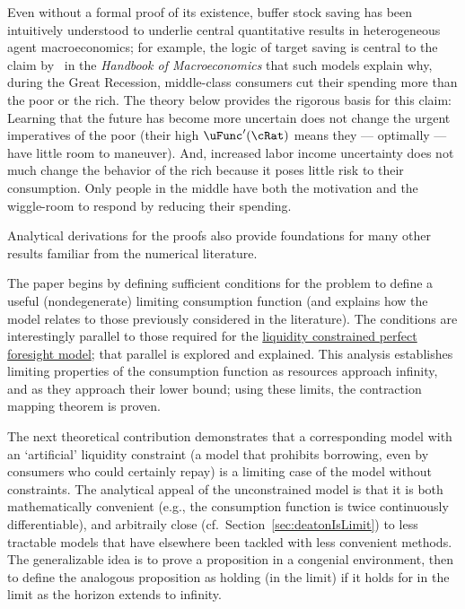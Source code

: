\documentclass[BufferStockTheory]{subfiles}
\begin{document}
\hypertarget{KMP}{} Even without a formal proof of its existence, buffer stock saving has been intuitively understood to underlie central quantitative results in heterogeneous agent macroeconomics; for example, the logic of target saving is central to the claim by~\cite{kmpHandbook} in the \textit{Handbook of Macroeconomics} that such models explain why, during the Great Recession, middle-class consumers cut their spending more than the poor or the rich.  The theory below provides the rigorous basis for this claim:  Learning that the future has become more uncertain does not change the urgent imperatives of the poor (their high $\uFunc^{\prime}(\cRat)$ means they --- optimally --- have little room to maneuver).  And, increased labor income uncertainty does not much change the behavior of the rich because it poses little risk to their consumption.  Only people in the middle have both the motivation and the wiggle-room to respond by reducing their spending.

Analytical derivations for the proofs also provide foundations for many other results familiar from the numerical literature.

The paper begins by defining sufficient conditions for the problem to define a useful (nondegenerate) limiting consumption function (and explains how the model relates to those previously considered in the literature).  The conditions are interestingly parallel to those required for the \hyperlink{Factors-Defined-And-Compared}{liquidity constrained perfect foresight model}; that parallel is explored and explained.  This analysis establishes limiting properties of the consumption function as resources approach infinity, and as they approach their lower bound; using these limits, the contraction mapping theorem is proven.

The next theoretical contribution demonstrates that a corresponding model with an `artificial' liquidity constraint (a model that prohibits borrowing, even by consumers who could certainly repay) is a limiting case of the model without constraints. The analytical appeal of the unconstrained model is that it is both mathematically convenient (e.g., the consumption function is twice continuously differentiable), and arbitraily close (cf.\ Section~\ref{sec:deatonIsLimit}) to less tractable models that have elsewhere been tackled with less convenient methods. The generalizable idea is to prove a proposition in a congenial environment, then to define the analogous proposition as holding (in the limit) if it holds for in the limit as the horizon extends to infinity.
\end{document}
